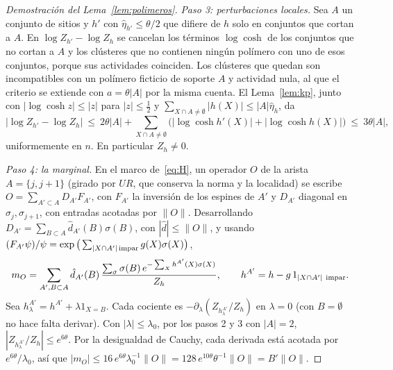 \documentclass[11pt,a4paper]{article}
\theoremstyle{remark}
\begin{document}
\begin{proof}[Demostración del Lema~\ref{lem:polimeros}]
\emph{Paso 3: perturbaciones locales.} Sea $A$ un conjunto de sitios y $h'$ con $\hat\eta_{h'}\le\theta/2$
que difiere de $h$ solo en conjuntos que cortan a $A$. En $\log Z_{h'}-\log Z_h$ se cancelan los
términos $\log\cosh$ de los conjuntos que no cortan a $A$ y los clústeres que no contienen ningún
polímero con uno de esos conjuntos, porque sus actividades coinciden. Los clústeres que quedan son
incompatibles con un polímero ficticio de soporte $A$ y actividad nula, al que el criterio se extiende
con $a=\theta|A|$ por la misma cuenta. El Lema~\ref{lem:kp}, junto con $|\log\cosh z|\le|z|$ para
$|z|\le\tfrac12$ y $\sum_{X\cap A\ne\emptyset}|h(X)|\le|A|\hat\eta_h$, da
\[
  |\log Z_{h'}-\log Z_h|\ \le\ 2\theta|A|+\sum_{X\cap A\ne\emptyset}\big(|\log\cosh h'(X)|+|\log\cosh h(X)|\big)\ \le\ 3\theta|A| ,
\]
uniformemente en $n$. En particular $Z_h\ne0$.

\emph{Paso 4: la marginal.} En el marco de~\eqref{eq:H}, un operador $O$ de la arista
$A=\{j,j{+}1\}$ (girado por $UR$, que conserva la norma y la localidad) se escribe
$O=\sum_{A'\subset A}D_{A'}F_{A'}$, con $F_{A'}$ la inversión de los espines de $A'$ y $D_{A'}$ diagonal
en $\sigma_j,\sigma_{j+1}$, con entradas acotadas por $\|O\|$. Desarrollando
$D_{A'}=\sum_{B\subset A}\hat d_{A'}(B)\sigma(B)$, con $|\hat d|\le\|O\|$, y usando
$(F_{A'}\psi)/\psi=\exp\big(\sum_{|X\cap A'|\,\rm impar}g(X)\sigma(X)\big)$,
\[
  m_O=\sum_{A',B\subset A}\hat d_{A'}(B)\,\frac{\sum_\sigma\sigma(B)\,e^{-\sum_Xh^{A'}(X)\sigma(X)}}{Z_h},\qquad
  h^{A'}=h-g\,1_{|X\cap A'|\ \rm impar}.
\]
Sea $h^{A'}_\lambda=h^{A'}+\lambda1_{X=B}$. Cada cociente es $-\partial_\lambda(Z_{h^{A'}_\lambda}/Z_h)$ en
$\lambda=0$ (con $B=\emptyset$ no hace falta derivar). Con $|\lambda|\le\lambda_0$, por los pasos 2 y 3
con $|A|=2$, $|Z_{h^{A'}_\lambda}/Z_h|\le e^{6\theta}$. Por la desigualdad de Cauchy, cada derivada está
acotada por $e^{6\theta}/\lambda_0$, así que $|m_O|\le16\,e^{6\theta}\lambda_0^{-1}\|O\|=128\,e^{10\theta}\theta^{-1}\|O\|=B'\|O\|$.
\end{proof}
\end{document}
